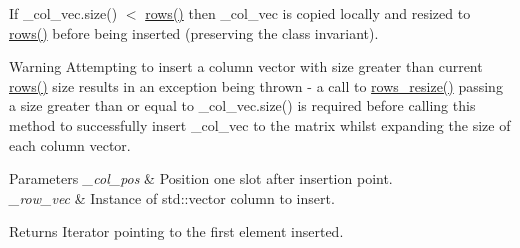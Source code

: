If {\ttfamily \+\_\+col\+\_\+vec.\+size() $<$ \hyperlink{classcrsc_1_1dynamic__matrix_a5d167a31d3be0ac09d3abdf57a11832d}{rows()}} then {\ttfamily \+\_\+col\+\_\+vec} is copied locally and resized to {\ttfamily \hyperlink{classcrsc_1_1dynamic__matrix_a5d167a31d3be0ac09d3abdf57a11832d}{rows()}} before being inserted (preserving the class invariant).

\begin{DoxyWarning}{Warning}
Attempting to insert a column vector with size greater than current {\ttfamily \hyperlink{classcrsc_1_1dynamic__matrix_a5d167a31d3be0ac09d3abdf57a11832d}{rows()}} size results in an exception being thrown -\/ a call to \hyperlink{classcrsc_1_1dynamic__matrix_a7a3ec3787c143699681fffa278d0ba4f}{rows\+\_\+resize()} passing a size greater than or equal to {\ttfamily \+\_\+col\+\_\+vec.\+size()} is required before calling this method to successfully insert {\ttfamily \+\_\+col\+\_\+vec} to the matrix whilst expanding the size of each column vector. 
\end{DoxyWarning}

\begin{DoxyParams}{Parameters}
{\em \+\_\+col\+\_\+pos} & Position one slot after insertion point. \\
\hline
{\em \+\_\+row\+\_\+vec} & Instance of {\ttfamily std\+::vector} column to insert. \\
\hline
\end{DoxyParams}
\begin{DoxyReturn}{Returns}
Iterator pointing to the first element inserted. 
\end{DoxyReturn}

